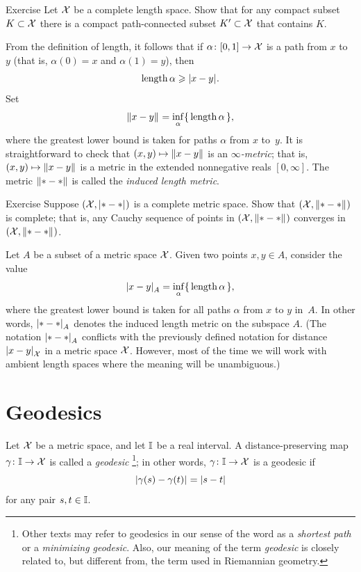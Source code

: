 \begin{thm}{Exercise}\label{ex:compact+connceted}
Let $\mathcal{X}$ be a complete length space.
Show that for any compact subset $K\subset\mathcal{X}$
there is a compact path-connected subset $K'\subset\mathcal{X}$ that contains $K$.
\end{thm}

From the definition of length, it follows that if $\alpha\colon[0,1]\to\mathcal{X}$ is a path from $x$ to $y$
(that is, $\alpha(0)=x$ and $\alpha(1)=y$), then 
\[\length\alpha\ge \dist{x}{y}{}.\]
Set 
\[\yetdist{x}{y}{}=\inf_\alpha\{\,\length\alpha\,\},\]
where the greatest lower bound is taken for paths $\alpha$ from $x$ to~$y$.
It is straightforward to check that $(x,y)\mapsto \yetdist{x}{y}{}$ is an \emph{$\infty$-metric};
that is, $(x,y)\mapsto \yetdist{x}{y}{}$ is a metric in the extended nonnegative reals $[0,\infty]$.
The metric $\yetdist{*}{*}{}$ is called the \emph{induced length metric}.

\begin{thm}{Exercise}\label{ex:compact=>complete}
Suppose $(\spc{X},\dist{*}{*}{})$ is a complete metric space.
Show that $(\spc{X},\yetdist{*}{*}{})$ is complete;
that is, any Cauchy sequence of points in $(\spc{X},\yetdist{*}{*}{})$ converges in $(\spc{X},\yetdist{*}{*}{})$.
\end{thm}

Let $A$ be a subset of a metric space $\mathcal{X}$.
Given two points $x,y\in A$,
consider the value
\[\dist{x}{y}{A}=\inf_{\alpha}\{\,\length\alpha\,\},
\]
where the greatest lower bound is taken for all paths $\alpha$ from $x$ to $y$ in~$A$.
In other words, $\dist{*}{*}{A}$ denotes the induced length metric on the subspace $A$.
(The notation $\dist{*}{*}{A}$ conflicts with the previously defined notation for distance $\dist{x}{y}{\spc{X}}$ in a metric space $\mathcal{X}$.
However, most of the time we will work with ambient length spaces where the meaning will be unambiguous.)

\section{Geodesics}

Let $\mathcal{X}$ be a metric space,
and let $\mathbb{I}$ be a real interval.
A distance-preserving map $\gamma\colon\mathbb{I}\to \mathcal{X}$ is called a \emph{geodesic}%
\footnote{Other texts may refer to geodesics in our sense of the word as  a \textit{shortest path} or a \textit{minimizing geodesic}.
Also, our meaning of the term \textit{geodesic} is closely related to, but different from, the term used in Riemannian geometry.};
in other words, $\gamma\:\II\z\to \spc{X}$ is a geodesic if 
\[\dist{\gamma(s)}{\gamma(t)}{}=|s-t|\]
for any pair $s,t\in \mathbb{I}$.

